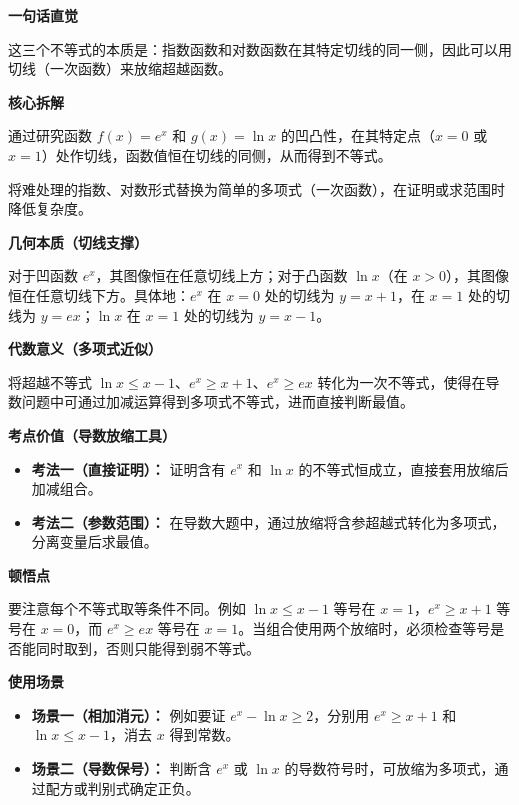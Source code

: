 \begin{explanationbox}
	\textbf{\textcolor{CExplanation}{一句话直觉}}

	这三个不等式的本质是：指数函数和对数函数在其特定切线的同一侧，因此可以用切线（一次函数）来放缩超越函数。

	\medskip
	\textbf{\textcolor{CExplanation}{核心拆解}}
	\begin{description}[style=nextline, leftmargin=2.8em, labelsep=0.5em, itemsep=0.45em]
		\item[\textbf{要点一（切线放缩）：}] 通过研究函数 $f(x)=e^x$ 和 $g(x)=\ln x$ 的凹凸性，在其特定点（$x=0$ 或 $x=1$）处作切线，函数值恒在切线的同侧，从而得到不等式。
		\item[\textbf{要点二（代数链接）：}] 将难处理的指数、对数形式替换为简单的多项式（一次函数），在证明或求范围时降低复杂度。
	\end{description}

	\medskip
	\textbf{\textcolor{CExplanation}{几何本质（切线支撑）}}

	对于凹函数 $e^x$，其图像恒在任意切线上方；对于凸函数 $\ln x$（在 $x>0$），其图像恒在任意切线下方。具体地：$e^x$ 在 $x=0$ 处的切线为 $y=x+1$，在 $x=1$ 处的切线为 $y=ex$；$\ln x$ 在 $x=1$ 处的切线为 $y=x-1$。

	\medskip
	\textbf{\textcolor{CExplanation}{代数意义（多项式近似）}}

	将超越不等式 $\ln x \le x-1$、$e^x \ge x+1$、$e^x \ge ex$ 转化为一次不等式，使得在导数问题中可通过加减运算得到多项式不等式，进而直接判断最值。

	\medskip
	\textbf{\textcolor{CExplanation}{考点价值（导数放缩工具）}}
	\begin{itemize}[leftmargin=*, itemsep=0.5em, topsep=0.4em]
		\item \textbf{考法一（直接证明）：} 证明含有 $e^x$ 和 $\ln x$ 的不等式恒成立，直接套用放缩后加减组合。
		\item \textbf{考法二（参数范围）：} 在导数大题中，通过放缩将含参超越式转化为多项式，分离变量后求最值。
	\end{itemize}

	\medskip
	\textbf{\textcolor{CExplanation}{顿悟点}}

	要注意每个不等式取等条件不同。例如 $\ln x \le x-1$ 等号在 $x=1$，$e^x \ge x+1$ 等号在 $x=0$，而 $e^x \ge ex$ 等号在 $x=1$。当组合使用两个放缩时，必须检查等号是否能同时取到，否则只能得到弱不等式。

	\medskip
	\textbf{\textcolor{CExplanation}{使用场景}}
	\begin{itemize}[leftmargin=*, itemsep=0.5em, topsep=0.4em]
		\item \textbf{场景一（相加消元）：} 例如要证 $e^x - \ln x \ge 2$，分别用 $e^x \ge x+1$ 和 $\ln x \le x-1$，消去 $x$ 得到常数。
		\item \textbf{场景二（导数保号）：} 判断含 $e^x$ 或 $\ln x$ 的导数符号时，可放缩为多项式，通过配方或判别式确定正负。
	\end{itemize}
\end{explanationbox}
